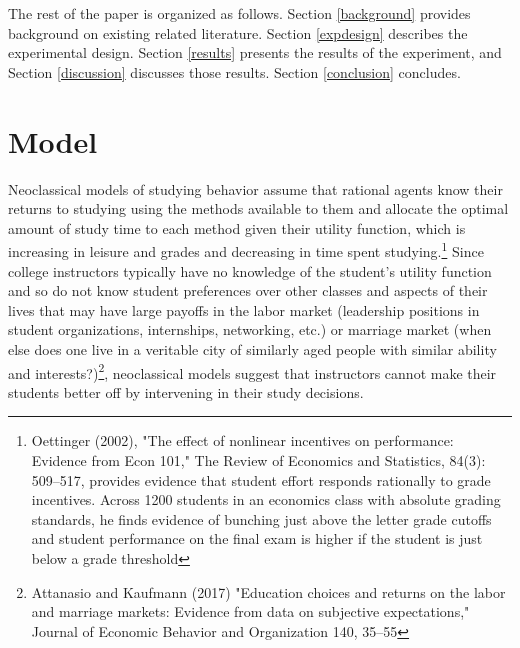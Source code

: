 \documentclass[12pt]{article}
\begin{document}
The rest of the paper is organized as follows. Section \ref{background} provides background on existing related literature. Section \ref{expdesign} describes the experimental design. Section \ref{results} presents the results of the experiment, and Section \ref{discussion} discusses those results. Section \ref{conclusion} concludes.



\section{Model}

Neoclassical models of studying behavior assume that rational agents know their returns to studying using the methods available to them and allocate the optimal amount of study time to each method given their utility function, which is increasing in leisure and grades and decreasing in time spent studying.\footnote{Oettinger (2002), "The effect of nonlinear incentives on performance: Evidence from Econ 101," The Review of Economics and Statistics, 84(3): 509–517, provides evidence that student effort responds rationally to grade incentives.  Across 1200 students in an economics class with absolute grading standards, he finds evidence of bunching just above the letter grade cutoffs and student performance on the final exam is higher if the student is just below a grade threshold} Since college instructors typically have no knowledge of the student's utility function and so do not know student preferences over other classes and aspects of their lives that may have large payoffs in the labor market (leadership positions in student organizations, internships, networking, etc.) or marriage market (when else does one live in a veritable city of similarly aged people with similar ability and interests?)\footnote{Attanasio and Kaufmann (2017) "Education choices and returns on the labor and marriage markets: Evidence from data on subjective expectations," Journal of Economic Behavior and Organization 140, 35–55}, neoclassical models suggest that instructors cannot make their students better off by intervening in their study decisions.
\end{document}
